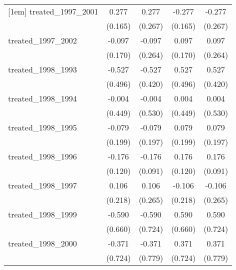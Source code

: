 {\begin{tabular}{l*{4}{c}}
[1em]
treated\_1997\_2001&       0.277         &       0.277         &      -0.277         &      -0.277         \\
            &     (0.165)         &     (0.267)         &     (0.165)         &     (0.267)         \\
[1em]
treated\_1997\_2002&      -0.097         &      -0.097         &       0.097         &       0.097         \\
            &     (0.170)         &     (0.264)         &     (0.170)         &     (0.264)         \\
[1em]
treated\_1998\_1993&      -0.527         &      -0.527         &       0.527         &       0.527         \\
            &     (0.496)         &     (0.420)         &     (0.496)         &     (0.420)         \\
[1em]
treated\_1998\_1994&      -0.004         &      -0.004         &       0.004         &       0.004         \\
            &     (0.449)         &     (0.530)         &     (0.449)         &     (0.530)         \\
[1em]
treated\_1998\_1995&      -0.079         &      -0.079         &       0.079         &       0.079         \\
            &     (0.199)         &     (0.197)         &     (0.199)         &     (0.197)         \\
[1em]
treated\_1998\_1996&      -0.176         &      -0.176         &       0.176         &       0.176         \\
            &     (0.120)         &     (0.091)         &     (0.120)         &     (0.091)         \\
[1em]
treated\_1998\_1997&       0.106         &       0.106         &      -0.106         &      -0.106         \\
            &     (0.218)         &     (0.265)         &     (0.218)         &     (0.265)         \\
[1em]
treated\_1998\_1999&      -0.590         &      -0.590         &       0.590         &       0.590         \\
            &     (0.660)         &     (0.724)         &     (0.660)         &     (0.724)         \\
[1em]
treated\_1998\_2000&      -0.371         &      -0.371         &       0.371         &       0.371         \\
            &     (0.724)         &     (0.779)         &     (0.724)         &     (0.779)         \\

\end{tabular}}
